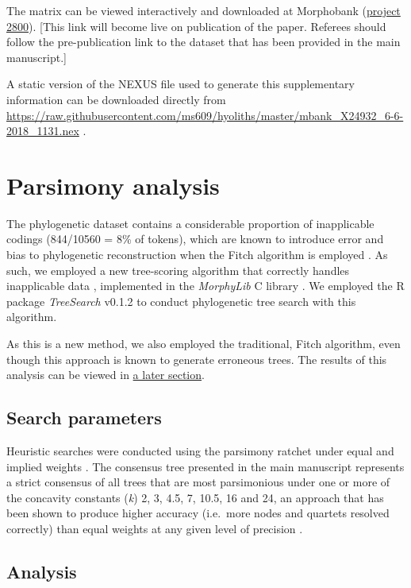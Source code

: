 \documentclass[openany]{book}
\theoremstyle{definition}
\theoremstyle{definition}
\theoremstyle{definition}
\theoremstyle{remark}
\begin{document}
The matrix can be viewed interactively and downloaded at Morphobank
(\href{https://morphobank.org/permalink/?P2800}{project 2800}). {[}This
link will become live on publication of the paper. Referees should
follow the pre-publication link to the dataset that has been provided in
the main manuscript.{]}

A static version of the NEXUS file used to generate this supplementary
information can be downloaded directly from
\url{https://raw.githubusercontent.com/ms609/hyoliths/master/mbank_X24932_6-6-2018_1131.nex}
.

\hypertarget{treesearch}{\chapter{Parsimony analysis}\label{treesearch}}

The phylogenetic dataset contains a considerable proportion of
inapplicable codings (844/10560 = 8\% of tokens), which are known to
introduce error and bias to phylogenetic reconstruction when the Fitch
algorithm is employed \citep{Maddison1993, Brazeau2018}. As such, we
employed a new tree-scoring algorithm that correctly handles
inapplicable data \citep{Brazeau2018}, implemented in the
\emph{MorphyLib} C library \citep{Brazeau2017Morphylib}. We employed the
R package \emph{TreeSearch} v0.1.2 \citep{Smith2018TreeSearch} to
conduct phylogenetic tree search with this algorithm.

As this is a new method, we also employed the traditional, Fitch
algorithm, even though this approach is known to generate erroneous
trees. The results of this analysis can be viewed in
\protect\hyperlink{fitch}{a later section}.

\section{Search parameters}\label{search-parameters}

Heuristic searches were conducted using the parsimony ratchet
\citep{Nixon1999} under equal and implied weights \citep{Goloboff1997}.
The consensus tree presented in the main manuscript represents a strict
consensus of all trees that are most parsimonious under one or more of
the concavity constants (\emph{k}) 2, 3, 4.5, 7, 10.5, 16 and 24, an
approach that has been shown to produce higher accuracy (i.e.~more nodes
and quartets resolved correctly) than equal weights at any given level
of precision \citep{Smith2017}.

\section{Analysis}\label{analysis}
\end{document}
